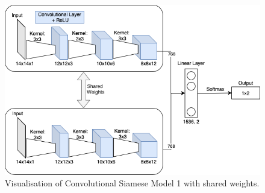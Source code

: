 \documentclass[10pt,conference,compsocconf]{IEEEtran}
\begin{document}
\begin{figure}[!t]
  \centering
  \includegraphics[width=\columnwidth]{doc/project1-report/siamese4.png}
  \vspace{-3mm}
  \caption{Visualisation of Convolutional Siamese Model 1 with shared weights.}
  \label{fig:siamese4}
\end{figure}

\end{document}
